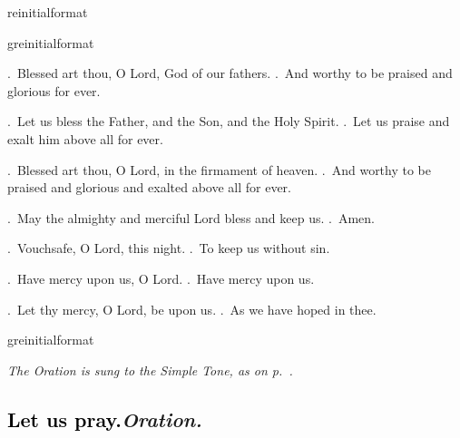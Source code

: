 \documentclass[12pt]{article} %
\newcommand{\myaboveinitial}[1]{%
    \expandafter\renewcommand\csname greinitialformat\endcsname[1]{%
        \fontsize{43}{43}\selectfont ##1
    }
    \gresetfirstlineaboveinitial{\textcolor{benred8}{\raisebox{6.0mm}{\small \textsc{\textbf{#1}}}}}{}
}
\newenvironment{rubric}{\vspace{1 mm}\color{benred8} \itshape \leftskip 0in \setlength{\parindent}{0.25in}}{\vspace{1 mm}}
\newenvironment{response}{\leftskip 0in \setlength{\parindent}{0in}}{\vspace{1 mm}}
\let\oldVbar\Vbar
\renewcommand{\Vbar}{\textcolor{benred8}{\oldVbar .}}
\let\oldRbar\Rbar
\renewcommand{\Rbar}{\textcolor{benred8}{\oldRbar .}}
\def\capitulumSpace{\hspace{20 mm}}
\begin{document}
\begin{pages}
\begin{Rightside}
\myaboveinitial{\Vbar}

\pend\pstart


\myaboveinitial{\Vbar}

\pend\pstart

\begin{response}
\Vbar\ Blessed art thou, O Lord, God of our fathers.
\Rbar\ And worthy to be praised and glorious for ever.

\Vbar\ Let us bless the Father, and the Son, and the Holy Spirit.
\Rbar\ Let us praise and exalt him above all for ever.

\Vbar\ Blessed art thou, O Lord, in the firmament of heaven.
\Rbar\ And worthy to be praised and glorious and exalted above all for ever.

\Vbar\ May the almighty and merciful Lord bless and keep us.
\Rbar\ Amen.

\Vbar\ Vouchsafe, O Lord, this night.
\Rbar\ To keep us without sin.

\Vbar\ Have mercy upon us, O Lord.
\Rbar\ Have mercy upon us.

\Vbar\ Let thy mercy, O Lord, be upon us.
\Rbar\ As we have hoped in thee.

\end{response}

\pend\pstart


\myaboveinitial{\Vbar}

\pend\pstart


\begin{rubric}
The Oration is sung to the Simple Tone, as on p.~\pageref{OratioSimplex}.

\end{rubric}

\pend\pstart

\subsection*{\textcolor{black}{Let us pray.}\capitulumSpace \emph{Oration.}}

\pend\pstart


\end{Rightside}
\end{pages}
\end{document}
